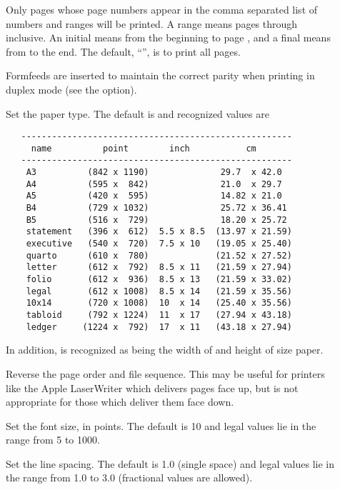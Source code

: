 \begin{description}
\item[]
   Only pages whose page numbers appear in the comma separated list of numbers
   and ranges will be printed.  A range  means pages  through
    inclusive.  An initial  means from the beginning to page
   , and a final  means from  to the end.  The
   default, ``\code{:}'', is to print all pages.

   Formfeeds are inserted to maintain the correct parity when printing in
   duplex mode (see the  option).

\item[\code{\#}]
   Set the paper type.  The default is  and recognized values are

\begin{verbatim}
   -----------------------------------------------------
     name          point        inch           cm
   -----------------------------------------------------
    A3          (842 x 1190)              29.7  x 42.0
    A4          (595 x  842)              21.0  x 29.7
    A5          (420 x  595)              14.82 x 21.0
    B4          (729 x 1032)              25.72 x 36.41
    B5          (516 x  729)              18.20 x 25.72
    statement   (396 x  612)  5.5 x 8.5  (13.97 x 21.59)
    executive   (540 x  720)  7.5 x 10   (19.05 x 25.40)
    quarto      (610 x  780)             (21.52 x 27.52)
    letter      (612 x  792)  8.5 x 11   (21.59 x 27.94)
    folio       (612 x  936)  8.5 x 13   (21.59 x 33.02)
    legal       (612 x 1008)  8.5 x 14   (21.59 x 35.56)
    10x14       (720 x 1008)  10  x 14   (25.40 x 35.56)
    tabloid     (792 x 1224)  11  x 17   (27.94 x 43.18)
    ledger     (1224 x  792)  17  x 11   (43.18 x 27.94)
\end{verbatim}

   \noindent
   In addition,  is recognized as being the width of 
   and height of  size paper.

\item[]
   Reverse the page order and file sequence.  This may be useful for printers
   like the Apple LaserWriter which delivers pages face up, but is not
   appropriate for those which deliver them face down.

\item[\code{\#}]
   Set the font size, in points.  The default is 10 and legal values lie in
   the range from 5 to 1000.

\item[\code{\#}]
   Set the line spacing.  The default is 1.0 (single space) and legal values
   lie in the range from 1.0 to 3.0 (fractional values are allowed).


\end{description}
